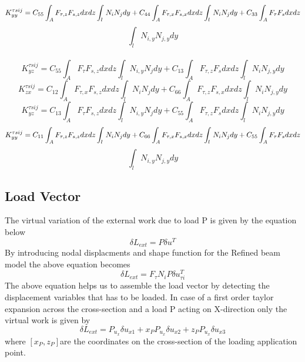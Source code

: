 \documentclass[a4paper,12pt]{article}
\begin{document}
$$ K_{yy}^{\tau s i j} = C_{55} \int_{A}^{} F_{\tau,z} F_{s,z} dx dz \int_{l}^{} N_{i} N_{j} dy + C_{44} \int_{A}^{} F_{\tau,x} F_{s,x} dx dz \int_{l}^{} N_{i} N_{j} dy + C_{33} \int_{A}^{} F_{\tau} F_{s} dx dz\\$$ $$\int_{l}^{} N_{i,y} N_{j,y} dy $$\\
$$ K_{yz}^{\tau s i j} = C_{55} \int_{A}^{} F_{\tau} F_{s,z} dx dz \int_{l}^{} N_{i,y} N_{j} dy + C_{13} \int_{A}^{} F_{\tau,z} F_{s} dx dz \int_{l}^{} N_{i} N_{j,y} dy$$
$$ K_{zx}^{\tau s i j} = C_{12} \int_{A}^{} F_{\tau,x} F_{s,z} dx dz \int_{l}^{} N_{i} N_{j} dy + C_{66} \int_{A}^{} F_{\tau,z} F_{s,x} dx dz \int_{l}^{} N_{i} N_{j,y} dy$$
$$ K_{yz}^{\tau s i j} = C_{13} \int_{A}^{} F_{\tau} F_{s,z} dx dz \int_{l}^{} N_{i,y} N_{j} dy + C_{55} \int_{A}^{} F_{\tau,z} F_{s} dx dz \int_{l}^{} N_{i} N_{j,y} dy$$
$$ K_{yy}^{\tau s i j} = C_{11} \int_{A}^{} F_{\tau,z} F_{s,z} dx dz \int_{l}^{} N_{i} N_{j} dy + C_{66} \int_{A}^{} F_{\tau,x} F_{s,x} dx dz \int_{l}^{} N_{i} N_{j} dy + C_{55} \int_{A}^{} F_{\tau} F_{s} dx dz\\$$ $$\int_{l}^{} N_{i,y} N_{j,y} dy $$

\subsection*{Load Vector}
\indent\indent\indent\indent The virtual variation of the external work due to load P is given by the equation below            
\begin{equation}
\delta L_{ext} = P\delta u^{T}
\end{equation}
By introducing nodal displacments and shape function for the Refined beam model the above equation becomes 
\begin{equation}
\delta L_{ext} = F_{\tau}N_{i}P\delta u^{T}_{\tau i}
\end{equation}
The above equation helps us to assemble the load vector  by detecting the displacement variables that has to be loaded. In case of a first order taylor expansion across the cross-section and a load P acting on X-direction only the virtual work is given by 
\begin{equation}
\delta L_{ext} = P_{u_{x}}\delta u_{x1} + x_{P} P_{u_{x}}\delta u_{x2} + z_{P} P_{u_{x}}\delta u_{x3}
\end{equation}
where $[x_{P}, z_{P}] $are the coordinates on the cross-section of the loading
application point.\\
\end{document}

